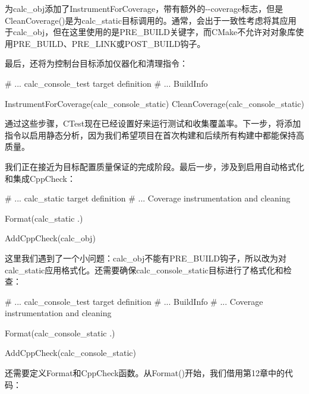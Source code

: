 为calc\_obj添加了InstrumentForCoverage，带有额外的-{}-coverage标志，但是CleanCoverage()是为calc\_static目标调用的。通常，会出于一致性考虑将其应用于calc\_obj，但在这里使用的是PRE\_BUILD关键字，而CMake不允许对对象库使用PRE\_BUILD、PRE\_LINK或POST\_BUILD钩子。

最后，还将为控制台目标添加仪器化和清理指令：


\begin{cmake}
# ... calc_console_test target definition
# ... BuildInfo

InstrumentForCoverage(calc_console_static)
CleanCoverage(calc_console_static)
\end{cmake}

通过这些步骤，CTest现在已经设置好来运行测试和收集覆盖率。下一步，将添加指令以启用静态分析，因为我们希望项目在首次构建和后续所有构建中都能保持高质量。


我们正在接近为目标配置质量保证的完成阶段。最后一步，涉及到启用自动格式化和集成CppCheck：


\begin{cmake}
# ... calc_static target definition
# ... Coverage instrumentation and cleaning

Format(calc_static .)

AddCppCheck(calc_obj)
\end{cmake}

这里我们遇到了一个小问题：calc\_obj不能有PRE\_BUILD钩子，所以改为对calc\_static应用格式化。还需要确保calc\_console\_static目标进行了格式化和检查：


\begin{cmake}
# ... calc_console_test target definition
# ... BuildInfo
# ... Coverage instrumentation and cleaning

Format(calc_console_static .)

AddCppCheck(calc_console_static)
\end{cmake}

还需要定义Format和CppCheck函数。从Format()开始，我们借用第12章中的代码：



